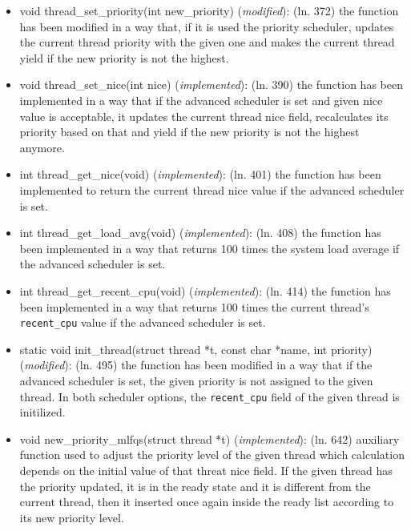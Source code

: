 \documentclass[11pt]{scrartcl}
\begin{document}
\begin{itemize}
	\item void thread\_set\_priority(int new\_priority) (\textit{modified}): \newline 
	(ln. 372) the function has been modified in a way that, if it is used the priority scheduler, updates the current thread priority with the given one and makes the current thread yield if the new priority is not the highest.
	
	\item void thread\_set\_nice(int nice) (\textit{implemented}): \newline 
	(ln. 390) the function has been implemented in a way that if the advanced scheduler is set and given nice value is acceptable, it updates the current thread nice field, recalculates its priority based on that and yield if the new priority is not the highest anymore.
	\item  int thread\_get\_nice(void) (\textit{implemented}): \newline 
	(ln. 401) the function has been implemented to return the current thread nice value if the advanced scheduler is set.
	\item int thread\_get\_load\_avg(void) (\textit{implemented}): \newline
	(ln. 408) the function has been implemented in a way that returns 100 times the system load average if the advanced scheduler is set.
	\item int thread\_get\_recent\_cpu(void) (\textit{implemented}): \newline
	(ln. 414) the function has been implemented in a way that returns 100 times the current thread's \texttt{recent\_cpu} value if the advanced scheduler is set.
	\item static void init\_thread(struct thread *t, const char *name, int priority) (\textit{modified}): \newline
	(ln. 495) the function has been modified in a way that if the advanced scheduler is set, the given priority is not assigned to the given thread. In both scheduler options, the \texttt{recent\_cpu} field of the given thread is initilized.
	\item void new\_priority\_mlfqs(struct thread *t) (\textit{implemented}): \newline
	(ln. 642) auxiliary function used to adjust the priority level of the given thread which calculation depends on the initial value of that threat nice field. 
	If the given thread has the priority updated, it is in the ready state and it is different from the current thread, then it inserted once again inside the ready list according to its new priority level.
	

\end{itemize}
\end{document}
